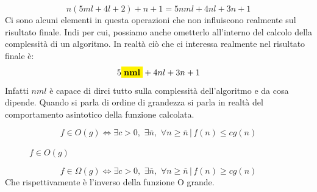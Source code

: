 \documentclass[a4paper]{article}
\begin{document}
\[n(5ml + 4l + 2) + n + 1 = 5nml + 4nl + 3n + 1\]
Ci sono alcuni elementi in questa operazioni che non influiscono realmente sul risultato finale. Indi per cui, possiamo anche ometterlo all'interno del calcolo della complessità di un algoritmo.
In realtà ciò che ci interessa realmente nel risultato finale è:
\[5\colorbox{yellow}{\textbf{nml}}+ 4nl + 3n + 1\]
Infatti $nml$ è capace di dirci tutto sulla complessità dell'algoritmo e da cosa dipende. 
Quando si parla di ordine di grandezza si parla in realtà del comportamento asintotico della funzione calcolata.
\begin{definition}
\[f \in O(g)  \Longleftrightarrow \exists c > 0, \,\, \exists \overline{n}, \,\, \forall n \ge \overline{n} \, | \, f(n) \le cg(n)\]
\end{definition}
\begin{figure}[H]
    \centering
    \caption{$f \in O(g)$}
\end{figure}

\begin{definition}
  \[f \in \Omega(g) \Longleftrightarrow \exists c > 0, \,\, \exists \overline{n}, \,\, \forall n \ge \overline{n} \, | \, f(n) \ge cg(n)\]  
  Che rispettivamente è l'inverso della funzione O grande.
\end{definition}
\end{document}
